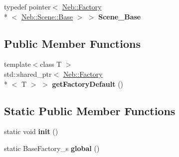 \begin{DoxyCompactItemize}
\item 
\hypertarget{classNeb_1_1App_1_1BaseFactory_a4d57ec8c91ce0c02f40c5a9ecb0bae6f}{typedef pointer$<$ \hyperlink{classNeb_1_1Factory}{Neb\-::\-Factory}\\*
$<$ \hyperlink{classNeb_1_1Scene_1_1Base}{Neb\-::\-Scene\-::\-Base} $>$ $>$ {\bfseries Scene\-\_\-\-Base}}\label{classNeb_1_1App_1_1BaseFactory_a4d57ec8c91ce0c02f40c5a9ecb0bae6f}

\end{DoxyCompactItemize}
\subsection*{Public Member Functions}
\begin{DoxyCompactItemize}
\item 
\hypertarget{classNeb_1_1App_1_1BaseFactory_a76250fbb3f8a06b4097b48fcea26884b}{{\footnotesize template$<$class T $>$ }\\std\-::shared\-\_\-ptr$<$ \hyperlink{classNeb_1_1Factory}{Neb\-::\-Factory}\\*
$<$ T $>$ $>$ {\bfseries get\-Factory\-Default} ()}\label{classNeb_1_1App_1_1BaseFactory_a76250fbb3f8a06b4097b48fcea26884b}

\end{DoxyCompactItemize}
\subsection*{Static Public Member Functions}
\begin{DoxyCompactItemize}
\item 
\hypertarget{classNeb_1_1App_1_1BaseFactory_a8abc6f8df757702cb7586e22a59cc70d}{static void {\bfseries init} ()}\label{classNeb_1_1App_1_1BaseFactory_a8abc6f8df757702cb7586e22a59cc70d}

\item 
\hypertarget{classNeb_1_1App_1_1BaseFactory_a3b8dc92ce1506c8f4bd046aed4b769c6}{static Base\-Factory\-\_\-s {\bfseries global} ()}\label{classNeb_1_1App_1_1BaseFactory_a3b8dc92ce1506c8f4bd046aed4b769c6}

\end{DoxyCompactItemize}
